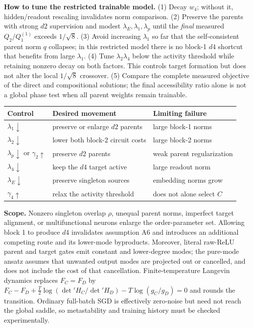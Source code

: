 \documentclass[10pt]{article}
\begin{document}
\textbf{How to tune the restricted trainable model.}
(1) Decay $w_4$; without it, hidden/readout rescaling invalidates norm comparison.
(2) Preserve the parents with strong $d2$ supervision and modest $\lambda_E,\lambda_1,
\lambda_p$ until the \emph{final} measured $Q_2/Q_1^{(1)}$ exceeds $1/\sqrt8$.
(3) Avoid increasing $\lambda_1$ so far that the self-consistent parent norm $q$ collapses;
in this restricted model there is no block-1 $d4$ shortcut that benefits from large $\lambda_1$.
(4) Tune $\lambda_2\lambda_4$ below the activity threshold while retaining nonzero decay on
both factors.  This controls target formation but does not alter the local $1/\sqrt8$ crossover.
(5) Compare the complete measured objective of the direct and compositional solutions; the
final accessibility ratio alone is not a global phase test when all parent weights remain trainable.

\begin{center}
\begin{tabular}{@{}lll@{}}
\toprule
Control & Desired movement & Limiting failure \\
\midrule
$\lambda_1\!\downarrow$ & preserve or enlarge $d2$ parents & large block-1 norms \\
$\lambda_2\!\downarrow$ & lower both block-2 circuit costs & large block-2 norms \\
$\lambda_p\!\downarrow$ or $\gamma_2\!\uparrow$ & preserve $d2$ parents & weak parent regularization \\
$\lambda_4\!\downarrow$ & keep the $d4$ target active & large readout norm \\
$\lambda_E\!\downarrow$ & preserve singleton sources & embedding norms grow \\
$\gamma_4\!\uparrow$ & relax the activity threshold & does not alone select $C$ \\
\bottomrule
\end{tabular}
\end{center}

\textbf{Scope.}
Nonzero singleton overlap $\rho$, unequal parent norms, imperfect target alignment, or
multifunctional neurons enlarge the order-parameter set.  Allowing block 1 to produce $d4$
invalidates assumption A6 and introduces an additional competing route and its lower-mode
byproducts.  Moreover, literal raw-ReLU parent and target gates emit constant and lower-degree
modes; the pure-mode ansatz assumes that unwanted output modes are projected out or cancelled,
and does not include the cost of that cancellation.  Finite-temperature Langevin
dynamics replaces $F_C=F_D$ by
$F_C-F_D+\tfrac{T}{2}\log(\det' H_C/\det' H_D)-T\log(g_C/g_D)=0$ and rounds the transition.
Ordinary full-batch SGD is effectively zero-noise but need not reach the global saddle, so
metastability and training history must be checked experimentally.
\end{document}
